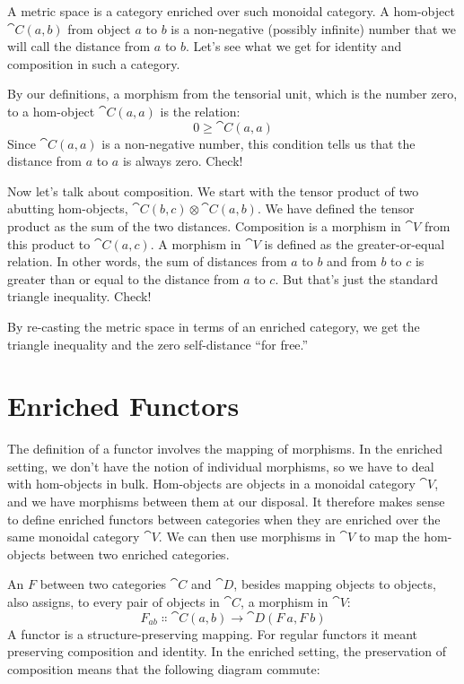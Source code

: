 A metric space is a category enriched over such monoidal category. A
hom-object $\cat{C}(a, b)$ from object $a$ to $b$ is a
non-negative (possibly infinite) number that we will call the distance
from $a$ to $b$. Let's see what we get for identity and
composition in such a category.

By our definitions, a morphism from the tensorial unit, which is the
number zero, to a hom-object $\cat{C}(a, a)$ is the relation:
\[0 \geqslant \cat{C}(a, a)\]
Since $\cat{C}(a, a)$ is a non-negative number, this condition tells
us that the distance from $a$ to $a$ is always zero.
Check!

Now let's talk about composition. We start with the tensor product of
two abutting hom-objects, $\cat{C}(b, c) \otimes \cat{C}(a, b)$. We have defined
the tensor product as the sum of the two distances. Composition is a
morphism in $\cat{V}$ from this product to $\cat{C}(a, c)$. A morphism
in $\cat{V}$ is defined as the greater-or-equal relation. In other words,
the sum of distances from $a$ to $b$ and from $b$
to $c$ is greater than or equal to the distance from $a$
to $c$. But that's just the standard triangle inequality. Check!

By re-casting the metric space in terms of an enriched category, we get
the triangle inequality and the zero self-distance ``for free.''

\section{Enriched Functors}

The definition of a functor involves the mapping of morphisms. In the
enriched setting, we don't have the notion of individual morphisms, so
we have to deal with hom-objects in bulk. Hom-objects are objects in a
monoidal category $\cat{V}$, and we have morphisms between them at our
disposal. It therefore makes sense to define enriched functors between
categories when they are enriched over the same monoidal category
$\cat{V}$. We can then use morphisms in $\cat{V}$ to map the hom-objects
between two enriched categories.

An  $F$ between two categories $\cat{C}$
and $\cat{D}$, besides mapping objects to objects, also assigns, to every
pair of objects in $\cat{C}$, a morphism in $\cat{V}$:
\[F_{a b} \Colon \cat{C}(a, b) \to \cat{D}(F\ a, F\ b)\]
A functor is a structure-preserving mapping. For regular functors it
meant preserving composition and identity. In the enriched setting, the
preservation of composition means that the following diagram commute:

